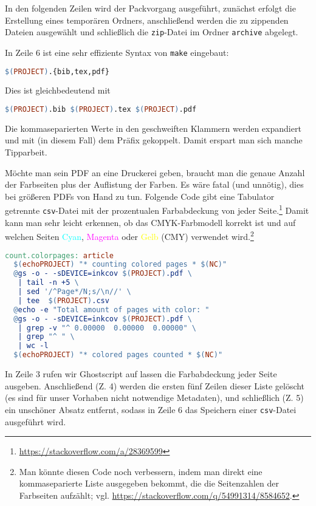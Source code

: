 \documentclass[ngerman]{dtk}
\begin{document}
In den folgenden Zeilen wird der Packvorgang ausgeführt,
zunächst erfolgt die Erstellung eines temporären Ordners,
anschließend werden die zu zippenden Dateien ausgewählt
 und schließlich die \texttt{zip}-Datei im Ordner \texttt{archive} abgelegt.

In Zeile 6 ist eine sehr effiziente Syntax von \texttt{make} eingebaut:
\begin{lstlisting}[style=noNumber,language=make]
$(PROJECT).{bib,tex,pdf}
\end{lstlisting}
Dies ist gleichbedeutend mit
\begin{lstlisting}[style=noNumber,language=make]
$(PROJECT).bib $(PROJECT).tex $(PROJECT).pdf
\end{lstlisting}
Die kommaseparierten Werte in den geschweiften Klammern
werden expandiert und mit (in diesem Fall) dem Präfix  gekoppelt.
Damit erspart man sich manche Tipparbeit.

Möchte man sein PDF an eine Druckerei geben,
braucht man die genaue Anzahl der Farbseiten plus der Auflistung der Farben.
Es wäre fatal (und unnötig), dies bei größeren PDFs von Hand zu tun.
Folgende Code gibt eine Tabulator getrennte \texttt{csv}-Datei
mit der prozentualen Farbabdeckung von jeder Seite.\footnote{\url{https://stackoverflow.com/a/28369599}}
Damit kann man sehr leicht erkennen,
ob das CMYK-Farbmodell korrekt ist und auf welchen Seiten
\textcolor{cyan}{Cyan},
\textcolor{magenta}{Magenta} oder
\textcolor{yellow}{Gelb} (CMY) verwendet wird.\footnote{Man könnte diesen Code noch verbessern,
indem man direkt eine kommaseparierte Liste ausgegeben bekommt,
die die Seitenzahlen der Farbseiten aufzählt; vgl. \url{https://stackoverflow.com/q/54991314/8584652}.}
\begin{lstlisting}[style=number,language=make]
count.colorpages: article
  $(echoPROJECT) "* counting colored pages * $(NC)"
  @gs -o - -sDEVICE=inkcov $(PROJECT).pdf \
   | tail -n +5 \
   | sed '/^Page*/N;s/\n//' \
   | tee  $(PROJECT).csv
  @echo -e "Total amount of pages with color: "
  @gs -o - -sDEVICE=inkcov $(PROJECT).pdf \
   | grep -v "^ 0.00000  0.00000  0.00000" \
   | grep "^ " \
   | wc -l
  $(echoPROJECT) "* colored pages counted * $(NC)"
\end{lstlisting}
In Zeile 3 rufen wir Ghostscript auf lassen die Farbabdeckung jeder Seite ausgeben.
Anschließend (Z. 4) werden die ersten fünf Zeilen dieser Liste gelöscht (es sind für unser Vorhaben nicht notwendige Metadaten),
und schließlich (Z. 5) ein unschöner Absatz entfernt,
sodass in Zeile 6 das Speichern einer \texttt{csv}-Datei ausgeführt wird.
\end{document}
